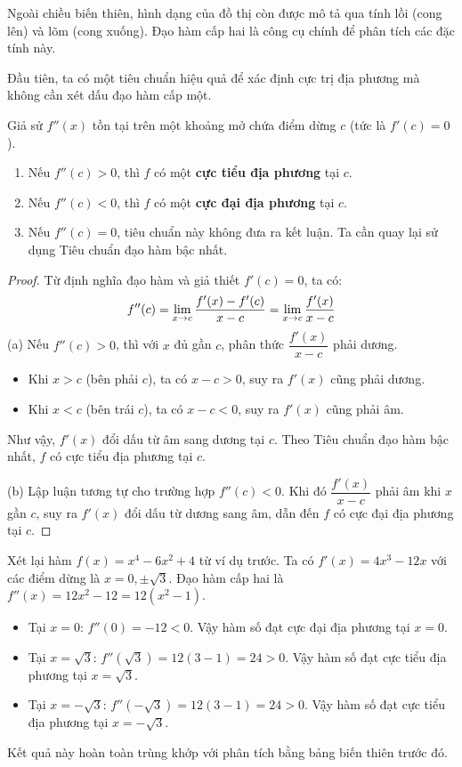 Ngoài chiều biến thiên, hình dạng của đồ thị còn được mô tả qua tính lồi (cong lên) và lõm (cong xuống). Đạo hàm cấp hai là công cụ chính để phân tích các đặc tính này.

Đầu tiên, ta có một tiêu chuẩn hiệu quả để xác định cực trị địa phương mà không cần xét dấu đạo hàm cấp một.

\begin{theorem}
\label{thm:second-derivative-test}
Giả sử $f''(x)$ tồn tại trên một khoảng mở chứa điểm dừng $c$ (tức là $f'(c)=0$).
\begin{enumerate}[label=(\alph*)]
    \item Nếu $f''(c) > 0$, thì $f$ có một \textbf{cực tiểu địa phương} tại $c$.
    \item Nếu $f''(c) < 0$, thì $f$ có một \textbf{cực đại địa phương} tại $c$.
    \item Nếu $f''(c) = 0$, tiêu chuẩn này không đưa ra kết luận. Ta cần quay lại sử dụng Tiêu chuẩn đạo hàm bậc nhất.
\end{enumerate}
\end{theorem}
\begin{proof}
Từ định nghĩa đạo hàm và giả thiết $f'(c)=0$, ta có:
$$f''(c) = \lim\limits_{x \to c}{\dfrac{f'(x) - f'(c)}{x-c}} = \lim\limits_{x \to c}{\dfrac{f'(x)}{x-c}}$$
(a) Nếu $f''(c) > 0$, thì với $x$ đủ gần $c$, phân thức $\dfrac{f'(x)}{x-c}$ phải dương.
\begin{itemize}
    \item Khi $x > c$ (bên phải $c$), ta có $x-c > 0$, suy ra $f'(x)$ cũng phải dương.
    \item Khi $x < c$ (bên trái $c$), ta có $x-c < 0$, suy ra $f'(x)$ cũng phải âm.
\end{itemize}
Như vậy, $f'(x)$ đổi dấu từ âm sang dương tại $c$. Theo Tiêu chuẩn đạo hàm bậc nhất, $f$ có cực tiểu địa phương tại $c$.

(b) Lập luận tương tự cho trường hợp $f''(c) < 0$. Khi đó $\dfrac{f'(x)}{x-c}$ phải âm khi $x$ gần $c$, suy ra $f'(x)$ đổi dấu từ dương sang âm, dẫn đến $f$ có cực đại địa phương tại $c$.
\end{proof}

\begin{example}
Xét lại hàm $f(x) = x^4 - 6x^2 + 4$ từ ví dụ trước. Ta có $f'(x) = 4x^3 - 12x$ với các điểm dừng là $x=0, \pm\sqrt{3}$.
Đạo hàm cấp hai là $f''(x) = 12x^2 - 12 = 12(x^2 - 1)$.
\begin{itemize}
    \item Tại $x=0$: $f''(0) = -12 < 0$. Vậy hàm số đạt cực đại địa phương tại $x=0$.
    \item Tại $x=\sqrt{3}$: $f''(\sqrt{3}) = 12(3-1) = 24 > 0$. Vậy hàm số đạt cực tiểu địa phương tại $x=\sqrt{3}$.
    \item Tại $x=-\sqrt{3}$: $f''(-\sqrt{3}) = 12(3-1) = 24 > 0$. Vậy hàm số đạt cực tiểu địa phương tại $x=-\sqrt{3}$.
\end{itemize}
Kết quả này hoàn toàn trùng khớp với phân tích bằng bảng biến thiên trước đó.
\end{example}

